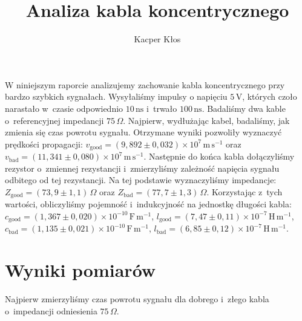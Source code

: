 \documentclass[12pt]{article}
\title{Analiza kabla koncentrycznego}
\author{Kacper Kłos}
\date{}
\begin{document}
\maketitle

W niniejszym raporcie analizujemy zachowanie kabla koncentrycznego przy bardzo szybkich sygnałach. Wysyłaliśmy impulsy o napięciu \(5\,\mathrm{V}\), których czoło narastało w~czasie odpowiednio \(10\,\mathrm{ns}\) i~trwało \(100\,\mathrm{ns}\). Badaliśmy dwa kable o~referencyjnej impedancji \(75\,\Omega\). \newline
Najpierw, wydłużając kabel, badaliśmy, jak zmienia się czas powrotu sygnału. Otrzymane wyniki pozwoliły wyznaczyć prędkości propagacji: \(v_{\mathrm{good}}=(9{,}892\pm0{,}032)\times10^{7}\,\mathrm{m\,s^{-1}}\) oraz \(v_{\mathrm{bad}}=(11{,}341\pm0{,}080)\times10^{7}\,\mathrm{m\,s^{-1}}\). \newline
Następnie do końca kabla dołączyliśmy rezystor o~zmiennej rezystancji i~zmierzyliśmy zależność napięcia sygnału odbitego od tej rezystancji. Na tej podstawie wyznaczyliśmy impedancje: \(Z_{\mathrm{good}}=(73{,}9\pm1{,}1)\,\Omega\) oraz \(Z_{\mathrm{bad}}=(77{,}7\pm1{,}3)\,\Omega\). \newline
Korzystając z~tych wartości, obliczyliśmy pojemność i~indukcyjność na jednostkę długości kabla: \(c_{\mathrm{good}}=(1{,}367\pm0{,}020)\times10^{-10}\,\mathrm{F\,m^{-1}}\), \(l_{\mathrm{good}}=(7{,}47\pm0{,}11)\times10^{-7}\,\mathrm{H\,m^{-1}}\), \(c_{\mathrm{bad}}=(1{,}135\pm0{,}021)\times10^{-10}\,\mathrm{F\,m^{-1}}\), \(l_{\mathrm{bad}}=(6{,}85\pm0{,}12)\times10^{-7}\,\mathrm{H\,m^{-1}}\).

\newpage

\section{Wyniki pomiarów}
Najpierw zmierzyliśmy czas powrotu sygnału dla dobrego i~złego kabla o~impedancji odniesienia \(75\,\Omega\).
\end{document}
